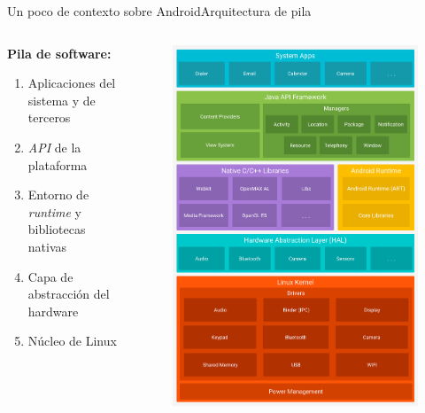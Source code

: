 \documentclass[pdf, handout]{beamer} %
\begin{document}
\begin{frame}{Un poco de contexto sobre Android}{Arquitectura de pila}
    \begin{columns}
        \begin{column}{.6\textwidth}
            \textbf{Pila de software:} \pause
            \begin{enumerate}[<+->]
                \item Aplicaciones del sistema y de terceros
                \item \textit{API} de la plataforma
                \item Entorno de \textit{runtime} y bibliotecas nativas
                \item Capa de abstracción del hardware
                \item Núcleo de Linux
            \end{enumerate}
        \end{column}

        \begin{column}{.4\textwidth}
            \begin{figure}
                \includegraphics[scale=0.09]{../imagenes/android-stack.png}
            \end{figure}
        \end{column}
    \end{columns}
\end{frame}
\end{document}
